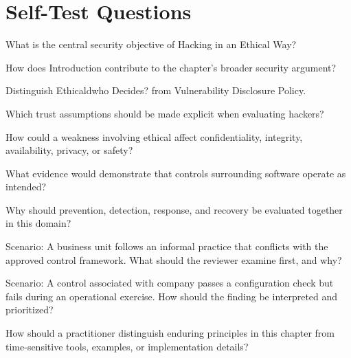 \documentclass[11pt,letterpaper]{article}
\begin{document}
\section*{Self-Test Questions}
\begin{CornellRecallList}
\item What is the central security objective of Hacking in an Ethical Way?
\item How does Introduction contribute to the chapter's broader security argument?
\item Distinguish Ethicaldwho Decides? from Vulnerability Disclosure Policy.
\item Which trust assumptions should be made explicit when evaluating hackers?
\item How could a weakness involving ethical affect confidentiality, integrity, availability, privacy, or safety?
\item What evidence would demonstrate that controls surrounding software operate as intended?
\item Why should prevention, detection, response, and recovery be evaluated together in this domain?
\item Scenario: A business unit follows an informal practice that conflicts with the approved control framework. What should the reviewer examine first, and why?
\item Scenario: A control associated with company passes a configuration check but fails during an operational exercise. How should the finding be interpreted and prioritized?
\item How should a practitioner distinguish enduring principles in this chapter from time-sensitive tools, examples, or implementation details?
\end{CornellRecallList}
\end{document}

